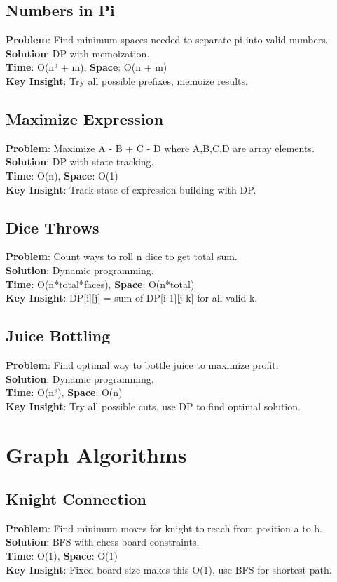 \documentclass{report}
\begin{document}
\subsection{Numbers in Pi}
\textbf{Problem}: Find minimum spaces needed to separate pi into valid numbers.\\
\textbf{Solution}: DP with memoization.\\
\textbf{Time}: O(n³ + m), \textbf{Space}: O(n + m)\\
\textbf{Key Insight}: Try all possible prefixes, memoize results.

\subsection{Maximize Expression}
\textbf{Problem}: Maximize A - B + C - D where A,B,C,D are array elements.\\
\textbf{Solution}: DP with state tracking.\\
\textbf{Time}: O(n), \textbf{Space}: O(1)\\
\textbf{Key Insight}: Track state of expression building with DP.

\subsection{Dice Throws}
\textbf{Problem}: Count ways to roll n dice to get total sum.\\
\textbf{Solution}: Dynamic programming.\\
\textbf{Time}: O(n*total*faces), \textbf{Space}: O(n*total)\\
\textbf{Key Insight}: DP[i][j] = sum of DP[i-1][j-k] for all valid k.

\subsection{Juice Bottling}
\textbf{Problem}: Find optimal way to bottle juice to maximize profit.\\
\textbf{Solution}: Dynamic programming.\\
\textbf{Time}: O(n²), \textbf{Space}: O(n)\\
\textbf{Key Insight}: Try all possible cuts, use DP to find optimal solution.

\section{Graph Algorithms}

\subsection{Knight Connection}
\textbf{Problem}: Find minimum moves for knight to reach from position a to b.\\
\textbf{Solution}: BFS with chess board constraints.\\
\textbf{Time}: O(1), \textbf{Space}: O(1)\\
\textbf{Key Insight}: Fixed board size makes this O(1), use BFS for shortest path.
\end{document}
